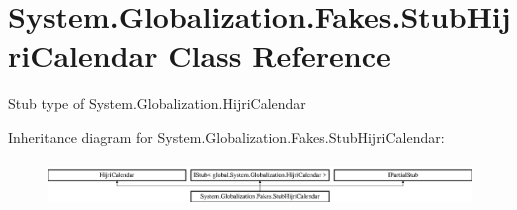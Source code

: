 \hypertarget{class_system_1_1_globalization_1_1_fakes_1_1_stub_hijri_calendar}{\section{System.\-Globalization.\-Fakes.\-Stub\-Hijri\-Calendar Class Reference}
\label{class_system_1_1_globalization_1_1_fakes_1_1_stub_hijri_calendar}
}


Stub type of System.\-Globalization.\-Hijri\-Calendar 


Inheritance diagram for System.\-Globalization.\-Fakes.\-Stub\-Hijri\-Calendar\-:\begin{figure}[H]
\begin{center}
\leavevmode
\includegraphics[height=1.224044cm]{class_system_1_1_globalization_1_1_fakes_1_1_stub_hijri_calendar}
\end{center}
\end{figure}
